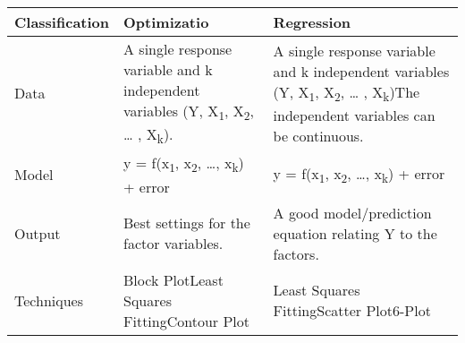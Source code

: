 \documentclass[]{book}
\theoremstyle{definition}
\theoremstyle{definition}
\theoremstyle{definition}
\theoremstyle{remark}
\begin{document}
\begin{longtable}[]{@{}lll@{}}
\toprule
\begin{minipage}[b]{0.14\columnwidth}\raggedright\strut
Classification\strut
\end{minipage} & \begin{minipage}[b]{0.39\columnwidth}\raggedright\strut
Optimizatio\strut
\end{minipage} & \begin{minipage}[b]{0.39\columnwidth}\raggedright\strut
Regression\strut
\end{minipage}\tabularnewline
\midrule
\endhead
\begin{minipage}[t]{0.14\columnwidth}\raggedright\strut
Data\strut
\end{minipage} & \begin{minipage}[t]{0.39\columnwidth}\raggedright\strut
A single response variable and k independent variables (Y,
X\textsubscript{1}, X\textsubscript{2}, \ldots{} ,
X\textsubscript{k}).\strut
\end{minipage} & \begin{minipage}[t]{0.39\columnwidth}\raggedright\strut
A single response variable and k independent variables (Y,
X\textsubscript{1}, X\textsubscript{2}, \ldots{} ,
X\textsubscript{k})The independent variables can be continuous.\strut
\end{minipage}\tabularnewline
\begin{minipage}[t]{0.14\columnwidth}\raggedright\strut
Model\strut
\end{minipage} & \begin{minipage}[t]{0.39\columnwidth}\raggedright\strut
y = f(x\textsubscript{1}, x\textsubscript{2}, \ldots{},
x\textsubscript{k}) + error\strut
\end{minipage} & \begin{minipage}[t]{0.39\columnwidth}\raggedright\strut
y = f(x\textsubscript{1}, x\textsubscript{2}, \ldots{},
x\textsubscript{k}) + error\strut
\end{minipage}\tabularnewline
\begin{minipage}[t]{0.14\columnwidth}\raggedright\strut
Output\strut
\end{minipage} & \begin{minipage}[t]{0.39\columnwidth}\raggedright\strut
Best settings for the factor variables.\strut
\end{minipage} & \begin{minipage}[t]{0.39\columnwidth}\raggedright\strut
A good model/prediction equation relating Y to the factors.\strut
\end{minipage}\tabularnewline
\begin{minipage}[t]{0.14\columnwidth}\raggedright\strut
Techniques\strut
\end{minipage} & \begin{minipage}[t]{0.39\columnwidth}\raggedright\strut
Block PlotLeast Squares FittingContour Plot\strut
\end{minipage} & \begin{minipage}[t]{0.39\columnwidth}\raggedright\strut
Least Squares FittingScatter Plot6-Plot\strut
\end{minipage}\tabularnewline
\bottomrule
\end{longtable}
\end{document}
